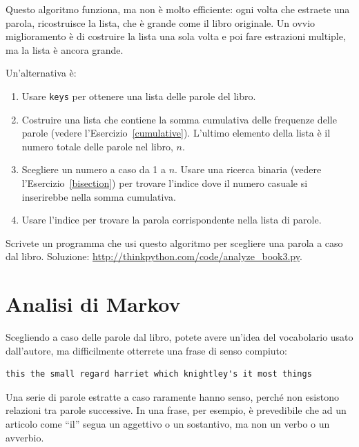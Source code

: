 \documentclass[10pt]{book}
\begin{document}
\vspace{0.2in}
\begin{exercise}
\label{randhist}

Questo algoritmo funziona, ma non è molto efficiente: ogni volta che estraete una parola, ricostruisce la lista, che è grande come il libro originale. Un ovvio miglioramento è di costruire la lista una sola volta e poi fare estrazioni multiple, ma la lista è ancora grande.

Un'alternativa è:

\begin{enumerate}

\item Usare {\tt keys} per ottenere una lista delle parole del libro.

\item Costruire una lista che contiene la somma cumulativa delle frequenze delle parole (vedere l'Esercizio~\ref{cumulative}).  L'ultimo elemento della lista è il numero totale delle parole nel libro, $n$.
  
\item Scegliere un numero a caso da 1 a $n$.  Usare una ricerca binaria
  (vedere l'Esercizio~\ref{bisection}) per trovare l'indice dove il numero casuale si inserirebbe nella somma cumulativa.

\item Usare l'indice per trovare la parola corrispondente nella lista di parole.

\end{enumerate}

Scrivete un programma che usi questo algoritmo per scegliere una parola a caso dal libro. Soluzione: \url{http://thinkpython.com/code/analyze_book3.py}.

\end{exercise}



\section{Analisi di Markov}
\label{markov}

Scegliendo a caso delle parole dal libro, potete avere un'idea del vocabolario usato dall'autore, ma difficilmente otterrete una frase di senso compiuto:

\begin{verbatim}
this the small regard harriet which knightley's it most things
\end{verbatim}
%
Una serie di parole estratte a caso raramente hanno senso, perché non esistono relazioni tra parole successive. In una frase, per esempio, è prevedibile che ad un articolo come ``il'' segua un aggettivo o un sostantivo, ma non un verbo o un avverbio.
\end{document}
